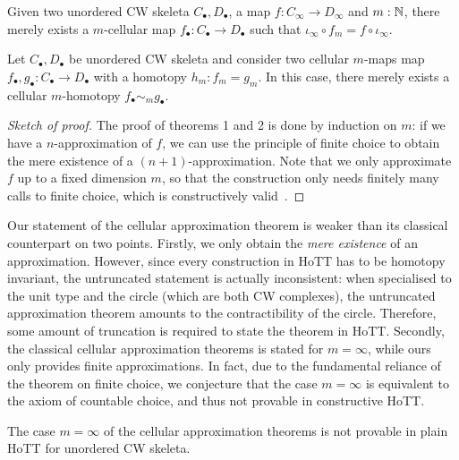 \documentclass{easychair}
\begin{document}
\begin{theorem}
  Given two unordered CW skeleta $C_\bullet,D_\bullet$, a map $f : C_\infty \to  D_\infty$ and
  $m:\mathbb{N}$, there merely exists a $m$-cellular map $f_\bullet : C_\bullet \to D_{\bullet}$ such that
  $\iota_{\infty} \circ f_m = f \circ \iota_{\infty}$.
\end{theorem}

\begin{theorem}
  Let $C_\bullet,D_\bullet$ be unordered CW skeleta and consider two
  cellular $m$-maps map $f_\bullet,g_\bullet : C_\bullet \to D_\bullet$ with a
  homotopy $h_m : f_m = g_m$. In this case, there merely exists a
  cellular $m$-homotopy $f_\bullet \sim_m g_\bullet$.
\end{theorem}

\begin{proof}[Sketch of proof]
The proof of theorems 1 and 2 is done by induction on \( m \):
%
if we have a \( n \)-approximation of \( f \), we can use the principle of finite choice to obtain
the mere existence of a \( (n+1) \)-approximation.
%
Note that we only approximate \( f \) up to a fixed dimension \( m \), so that the construction
only needs finitely many calls to finite choice, which is constructively valid~\cite[exercise 3.22]{HoTT13}.
\end{proof}

Our statement of the cellular approximation theorem is weaker than its classical counterpart on two
points.
%
Firstly, we only obtain the \emph{mere existence} of an approximation. However, since every
construction in HoTT has to be homotopy invariant, the untruncated statement is actually
inconsistent: when specialised to the unit type and the circle (which are both CW complexes),
the untruncated approximation theorem amounts to the contractibility of the circle.
Therefore, some amount of truncation is required to state the theorem in HoTT.
%
Secondly, the classical cellular approximation theorems is stated for \( m = \infty \), while
ours only provides finite approximations.
%
In fact, due to the fundamental reliance of the theorem on finite choice, we conjecture that the
case \( m = \infty \) is equivalent to the axiom of countable choice, and thus not provable in
constructive HoTT.

\begin{conjecture}
  The case \( m = \infty \) of the cellular approximation theorems is not provable in plain HoTT
  for unordered CW skeleta.
\end{conjecture}
\end{document}
